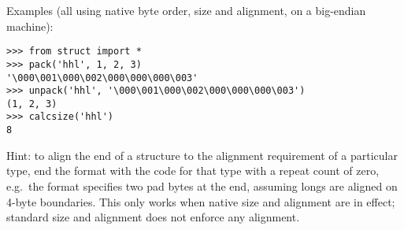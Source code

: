 Examples (all using native byte order, size and alignment, on a
big-endian machine):

\begin{verbatim}
>>> from struct import *
>>> pack('hhl', 1, 2, 3)
'\000\001\000\002\000\000\000\003'
>>> unpack('hhl', '\000\001\000\002\000\000\000\003')
(1, 2, 3)
>>> calcsize('hhl')
8
\end{verbatim}

Hint: to align the end of a structure to the alignment requirement of
a particular type, end the format with the code for that type with a
repeat count of zero, e.g.\ the format  specifies two
pad bytes at the end, assuming longs are aligned on 4-byte boundaries.
This only works when native size and alignment are in effect;
standard size and alignment does not enforce any alignment.

\begin{seealso}
\end{seealso}
